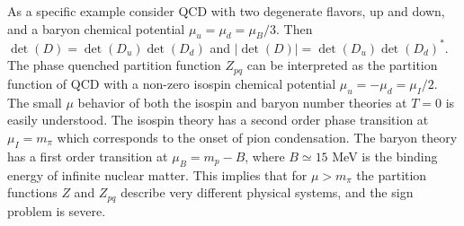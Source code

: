 As a specific example consider QCD with two degenerate flavors, up and
down, and a baryon chemical potential $\mu_u=\mu_d=\mu_B/3$. Then 
$\det(D)=\det(D_u)\det(D_d)$ and $|\det(D)|=\det(D_u)\det(D_d)^*$.
The phase quenched partition function 
$Z_{pq}$ can be interpreted as the partition function of QCD with a
non-zero isospin chemical potential $\mu_u=-\mu_d=\mu_I/2$. The small
$\mu$ behavior of both the isospin and baryon number theories at $T=0$
is easily understood. The isospin theory has a second order phase
transition at $\mu_I=m_\pi$ which corresponds to the onset of pion
condensation. The baryon theory has a first order transition at
$\mu_B=m_p-B$, where $B\simeq 15$ MeV is the binding energy of infinite
nuclear matter. This implies that for $\mu>m_\pi$ the partition functions
$Z$ and $Z_{pq}$ describe very different physical systems, and the 
sign problem is severe. 

